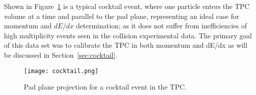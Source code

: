 Shown in Figure~\ref{fig:cocktail} is a typical cocktail event, where one particle enters the TPC volume at a time and parallel to the pad plane, representing an ideal case for momentum and $dE/dx$ determination; as it does not suffer from inefficiencies of high multiplicity events seen in the collision experimental data. The primary goal of this data set was to calibrate the TPC in both momentum and dE/dx as will be discussed in Section~\ref{sec:cocktail}. 

\begin{figure}[!htb]
\texttt{[image: cocktail.png]}
\caption{Pad plane projection for a cocktail event in the TPC.}
\label{fig:cocktail}
\end{figure}



